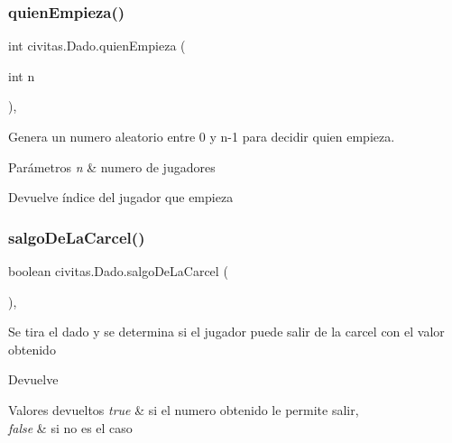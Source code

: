 \subsubsection{\texorpdfstring{quien\+Empieza()}{quienEmpieza()}}
{\footnotesize\ttfamily int civitas.\+Dado.\+quien\+Empieza (\begin{DoxyParamCaption}\item[{int}]{n }\end{DoxyParamCaption})\hspace{0.3cm}{\ttfamily [inline]}, {\ttfamily [package]}}

Genera un numero aleatorio entre 0 y n-\/1 para decidir quien empieza. 
\begin{DoxyParams}{Parámetros}
{\em n} & numero de jugadores \\
\hline
\end{DoxyParams}
\begin{DoxyReturn}{Devuelve}
índice del jugador que empieza 
\end{DoxyReturn}
\mbox{\label{classcivitas_1_1Dado_ad251122d68a0c513c533c508c9a004d5}} 
\subsubsection{\texorpdfstring{salgo\+De\+La\+Carcel()}{salgoDeLaCarcel()}}
{\footnotesize\ttfamily boolean civitas.\+Dado.\+salgo\+De\+La\+Carcel (\begin{DoxyParamCaption}{ }\end{DoxyParamCaption})\hspace{0.3cm}{\ttfamily [inline]}, {\ttfamily [package]}}

Se tira el dado y se determina si el jugador puede salir de la carcel con el valor obtenido \begin{DoxyReturn}{Devuelve}

\end{DoxyReturn}

\begin{DoxyRetVals}{Valores devueltos}
{\em true} & si el numero obtenido le permite salir, \\
\hline
{\em false} & si no es el caso \\
\hline
\end{DoxyRetVals}
\mbox{\label{classcivitas_1_1Dado_aa12af1adaeed10bfb47e314712bf3b7f}} 
